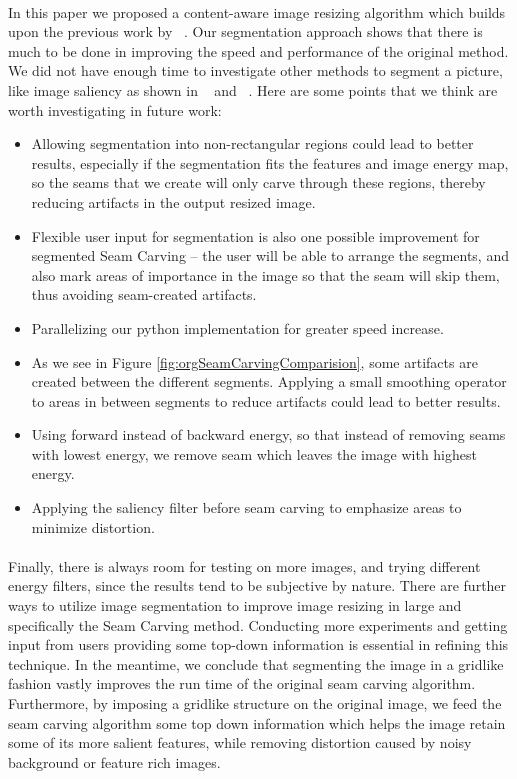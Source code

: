 \documentclass[conference]{acmsiggraph}
\begin{document}
\paragraph{}
In this paper we proposed a content-aware image resizing algorithm which builds upon the previous work by ~\cite{Avidan2007}. Our segmentation approach shows that there is much to be done in improving the speed and performance of the original method. We did not have enough time to investigate other methods to segment a picture, like image saliency as shown in ~\cite{Liu2007} and ~\cite{Hasan2009}. Here are some points that we think are worth investigating in future work:

\begin{itemize}
  \item Allowing segmentation into non-rectangular regions could lead to better results, especially if the segmentation fits the features and image energy map, so the seams that we create will only carve through these regions, thereby reducing artifacts in the output resized image.
  \item Flexible user input for segmentation is also one possible improvement for segmented Seam Carving -- the user will be able to arrange the segments, and also mark areas of importance in the image so that the seam will skip them, thus avoiding seam-created artifacts. 
  \item Parallelizing our python implementation for greater speed increase.
  \item As we see in Figure \ref{fig:orgSeamCarvingComparision}, some artifacts are created between the different segments. Applying a small smoothing operator to areas in between segments to reduce artifacts could lead to better results.
  \item Using forward instead of backward energy, so that instead of removing seams with lowest energy, we remove seam which leaves the image with highest energy.
  \item Applying the saliency filter before seam carving to emphasize areas to minimize distortion.  
\end{itemize}


\paragraph{}
Finally, there is always room for testing on more images, and trying different energy filters, since the results tend to be subjective by nature. There are further ways to utilize image segmentation to improve image resizing in large and specifically the Seam Carving method.  Conducting more experiments and getting input from users providing some top-down information is essential in refining this technique.  In the meantime, we conclude that segmenting the image in a gridlike fashion vastly improves the run time of the original seam carving algorithm.  Furthermore, by imposing a gridlike structure on the original image, we feed the seam carving algorithm some top down information which helps the image retain some of its more salient features, while removing distortion caused by noisy background or feature rich images.  



\end{document}
